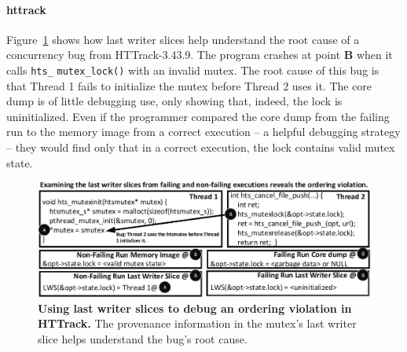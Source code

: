 \documentclass[pageno,nohyperref]{jpaper}
\newcommand{\Caption}[1]{\begin{minipage}{.95\columnwidth} \caption{#1} \end{minipage} \vspace{-1.2ex}}
\begin{document}
%


\paragraph{httrack}
Figure~\ref{fig:httlws} shows how last writer slices help understand the root
cause of a concurrency bug from HTTrack-3.43.9.  The program crashes at point
{\bf B} when it calls {\tt hts\_} {\tt mutex\_lock()} with an invalid mutex.    The
root cause of this bug is that Thread 1 fails to initialize the mutex before
Thread 2 uses it.   The core dump is of little debugging use, only showing
that, indeed, the lock is uninitialized.  Even if the programmer compared the
core dump from the failing run to the memory image from a correct execution --
a helpful debugging strategy -- they would find only that in a correct
execution, the lock contains valid mutex state.

\begin{figure}[h]
\centering
\includegraphics[width=\columnwidth]{figs/LWSHTTDebug.pdf}
\Caption{\label{fig:httlws}{\bf Using last writer slices to debug an
ordering violation in HTTrack.} The provenance information in the mutex's last
writer slice helps understand the bug's root cause.}
\end{figure}
\end{document}
